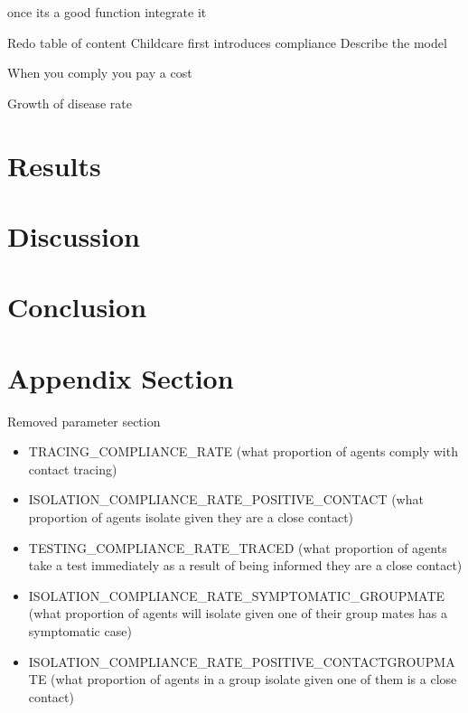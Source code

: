 \documentclass{article}
\begin{document}
once its a good function integrate it 

Redo table of content
Childcare first introduces compliance
Describe the model
 
When you comply you pay a cost

Growth of disease rate



\section{Results}

\section{Discussion}

\section{Conclusion}

\newpage
\appendix

\section{Appendix Section}

Removed parameter section
\begin{itemize}
\item TRACING\_COMPLIANCE\_RATE (what proportion of agents comply with contact tracing)
\item ISOLATION\_COMPLIANCE\_RATE\_POSITIVE\_CONTACT (what proportion of agents isolate given they are a close contact) 

\item TESTING\_COMPLIANCE\_RATE\_TRACED (what proportion of agents take a test immediately as a result of being informed they are a close contact)


\item ISOLATION\_COMPLIANCE\_RATE\_SYMPTOMATIC\_GROUPMATE (what proportion of agents will isolate given one of their group mates has a symptomatic case)

\item ISOLATION\_COMPLIANCE\_RATE\_POSITIVE\_CONTACTGROUPMATE (what proportion of agents in a group isolate given one of them is a close contact)
\end{itemize}
\end{document}
